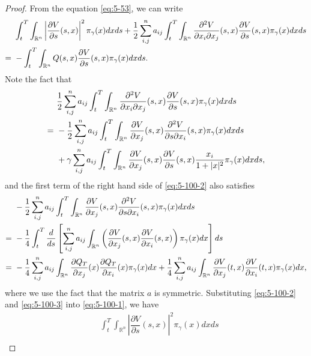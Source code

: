 \documentclass[11pt]{article}
\numberwithin{equation}{section}
\newcommand{\brn}{{\mathbb{R}^n}}
\newcommand{\1}{\mbox{1\hspace{-1mm}I}}
\begin{document}
\begin{proof}
From the equation \eqref{eq:5-53}, we can write 
\begin{align}
    &\int_{t}^{T}\int_{\brn}\left|\dfrac{\partial V}{\partial s}(s,x)\right|^{2}\pi_{\gamma}(x)dxds+\dfrac{1}{2}\sum_{i,j}^n a_{ij}\int_{t}^{T}\int_{\brn}\dfrac{\partial^{2}V}{\partial x_{i}\partial x_{j}}(s,x)\dfrac{\partial V}{\partial s}(s,x)\pi_{\gamma}(x)dxds \notag \\
    =\ & -\int_{t}^{T}\int_{\brn}Q(s,x)\dfrac{\partial V}{\partial s}(s,x)\pi_{\gamma}(x)dxds. \label{eq:5-100-1}
\end{align}
Note the fact that
\begin{align}
    &\dfrac{1}{2}\sum_{i,j}^n a_{ij}\int_{t}^{T}\int_{\brn}\dfrac{\partial^{2}V}{\partial x_{i}\partial x_{j}}(s,x)\dfrac{\partial V}{\partial s}(s,x)\pi_{\gamma}(x)dxds \notag \\
    =\ & -\dfrac{1}{2}\sum_{i,j}^n a_{ij}\int_{t}^{T}\int_{\brn}\dfrac{\partial V}{\partial x_{j}}(s,x)\dfrac{\partial^{2}V}{\partial s\partial x_{i}}(s,x)\pi_{\gamma}(x)dxds \notag \\
    &+\gamma\sum_{i,j}^n a_{ij}\int_{t}^{T}\int_{\brn}\dfrac{\partial V}{\partial x_{j}}(s,x)\dfrac{\partial V}{\partial s}(s,x)\dfrac{x_{i}}{1+|x|^{2}}\pi_{\gamma}(x)dxds, \label{eq:5-100-2}
\end{align}
and the first term of the right hand side of \eqref{eq:5-100-2} also satisfies
\begin{align}
    &-\dfrac{1}{2}\sum_{i,j}^n a_{ij} \int_{t}^{T}\int_{\brn}\dfrac{\partial V}{\partial x_{j}}(s,x)\dfrac{\partial^{2}V}{\partial s\partial x_{i}}(s,x)\pi_{\gamma}(x)dxds \notag \\
    =\ & -\frac{1}{4} \int_{t}^{T} \frac{d}{ds}\left[\sum_{i,j}^n a_{ij}\int_{\brn}\left(\dfrac{\partial V}{\partial x_{j}}(s,x)\dfrac{\partial V}{\partial x_{i}}(s,x)\right)\pi_{\gamma}(x) dx\right]ds \notag \\
    =\ & -\dfrac{1}{4}\sum_{i,j}^n a_{ij}\int_{\brn}\dfrac{\partial Q_{T}}{\partial x_{j}}(x)\dfrac{\partial Q_{T}}{\partial x_{i}}(x)\pi_{\gamma}(x)dx+\dfrac{1}{4}\sum_{i,j}^n a_{ij}\int_{\brn}\dfrac{\partial V}{\partial x_{j}}(t,x)\dfrac{\partial V}{\partial x_{i}}(t,x)\pi_{\gamma}(x)dx, \label{eq:5-100-3}
\end{align}
where we use the fact that the matrix $a$ is symmetric. Substituting \eqref{eq:5-100-2} and \eqref{eq:5-100-3} into \eqref{eq:5-100-1}, we have
\begin{align*}
    &\int_{t}^{T}\int_{\brn}\left|\dfrac{\partial V}{\partial s}(s,x)\right|^{2}\pi_{\gamma}(x)dxds  \\

\end{align*}
\end{proof}
\end{document}
